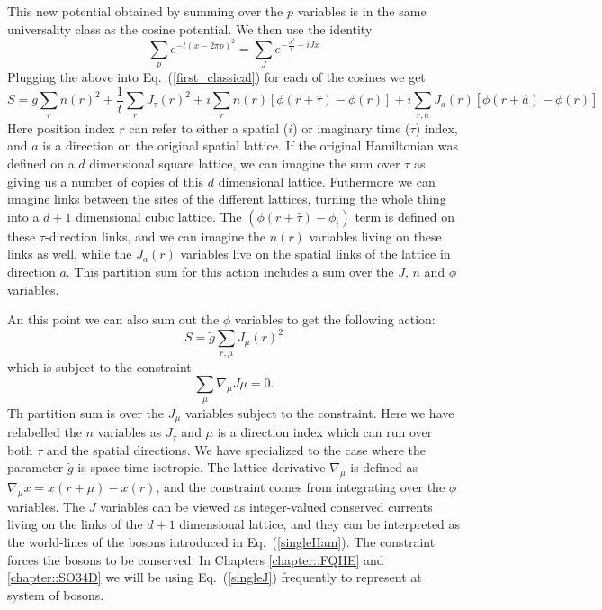 This new potential obtained by summing over the $p$ variables is in the same universality class as the cosine potential. We then use the identity
\begin{equation}
\sum_p e^{-t(x-2\pi p)^2}=\sum_{J} e^{-\frac{J^2}{t}+iJ x}
\label{Villain2}
\end{equation}
Plugging the above into Eq.~(\ref{first_classical}) for each of the cosines we get
\begin{equation}
S=g\sum_{r} n(r)^2 + \frac{1}{t}\sum_r J_\tau(r)^2 + i\sum_r n(r) [\phi(r+\hat\tau)-\phi(r)] + i\sum_{r,a} J_{a}(r) [\phi(r+\hat a)-\phi(r)]
\end{equation}
Here position index $r$ can refer to either a spatial ($i$) or imaginary time ($\tau$) index, and $a$ is a direction on the original spatial lattice. If the original Hamiltonian was defined on a $d$ dimensional square lattice, we can imagine the sum over $\tau$ as giving us a number of copies of this $d$ dimensional lattice. Futhermore we can imagine links between the sites of the different lattices, turning the whole thing into a $d+1$ dimensional cubic lattice. The $(\phi(r+\hat\tau)-\phi_i)$ term is defined on these $\tau$-direction links, and we can imagine the $n(r)$ variables living on these links as well, while the $J_a(r)$ variables live on the spatial links of the lattice in direction $a$. This partition sum for this action includes a sum over the $J$, $n$ and $\phi$ variables.

An this point we can also sum out the $\phi$ variables to get the following action:
\begin{equation}
S=\tilde g\sum_{r,\mu} J_\mu(r)^2
\label{singleJ}
\end{equation}
which is subject to the constraint 
\begin{equation}
\sum_\mu \nabla_\mu J\mu=0.
\label{constraint}
\end{equation}
Th partition sum is over the $J_\mu$ variables subject to the constraint. Here we have relabelled the $n$ variables as $J_\tau$ and $\mu$ is a direction index which can run over both $\tau$ and the spatial directions. We have specialized to the case where the parameter $\tilde g$ is space-time isotropic. The lattice derivative $\nabla_\mu$ is defined as $\nabla_\mu x= x(r+\mu)-x(r)$, and the constraint comes from integrating over the $\phi$ variables. The $J$ variables can be viewed as integer-valued conserved currents living on the links of the $d+1$ dimensional lattice, and they can be interpreted as the world-lines of the bosons introduced in Eq.~(\ref{singleHam}). The constraint forces the bosons to be conserved. In Chapters \ref{chapter::FQHE} and \ref{chapter::SO34D} we will be using Eq.~(\ref{singleJ}) frequently to represent at system of bosons.

